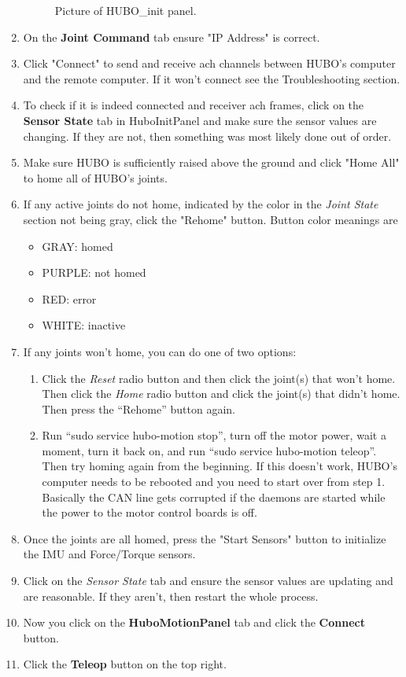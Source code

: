 \documentclass[letterpaper, 10 pt]{report}
\begin{document}
\begin{enumerate}
\begin{figure}[ht]
    \caption{Picture of HUBO\_init panel.}
    \label{fig:hubo-init-image}
  \end{figure}
  \item On the \textbf{Joint Command} tab ensure "IP Address" is correct.
  \item Click "Connect" to send and receive ach channels between HUBO's computer and the remote computer. If it won't connect see the Troubleshooting section.
  \item To check if it is indeed connected and receiver ach frames, click on the \textbf{Sensor State} tab in HuboInitPanel and make sure the sensor values are changing. If they are not, then something was most likely done out of order.
  \item Make sure HUBO is sufficiently raised above the ground and click "Home All" to home all of HUBO's joints.
  \item If any active joints do not home, indicated by the color in the \textit{Joint State} section not being gray, click the "Rehome" button. Button color meanings are
    \begin{itemize}
      \item GRAY: homed
      \item PURPLE: not homed
      \item RED: error
      \item WHITE: inactive
    \end{itemize}
  \item If any joints won't home, you can do one of two options:
    \begin{enumerate}
      \item Click the \textit{Reset} radio button and then click the joint(s) that won't home. Then click the \textit{Home} radio button and click the joint(s) that didn't home. Then press the ``Rehome'' button again.
      \item Run ``sudo service hubo-motion stop'', turn off the motor power, wait a moment, turn it back on, and run ``sudo service hubo-motion teleop''. Then try homing again from the beginning. If this doesn't work, HUBO's computer needs to be rebooted and you need to start over from step 1. Basically the CAN line gets corrupted if the daemons are started while the power to the motor control boards is off.
    \end{enumerate}
  \item Once the joints are all homed, press the "Start Sensors" button to initialize the IMU and Force/Torque sensors.
  \item Click on the \textit{Sensor State} tab and ensure the sensor values are updating and are reasonable. If they aren't, then restart the whole process.
  \item Now you click on the \textbf{HuboMotionPanel} tab and click the \textbf{Connect} button.
  \item Click the \textbf{Teleop} button on the top right.
\end{enumerate}
\end{document}
